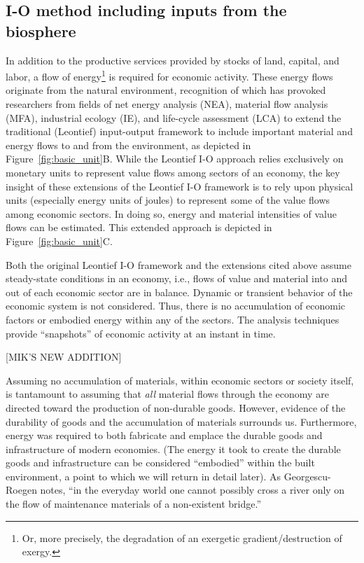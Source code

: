 \subsection{I-O method including inputs from the biosphere}

In addition to the productive services provided by stocks of land, capital, and labor,
a flow of energy\footnote{Or, more precisely, 
the degradation of an exergetic gradient/destruction of exergy.} 
is required for economic activity. 
These energy flows originate from the natural environment, 
recognition of which has provoked researchers from fields of 
net energy analysis (NEA), 
material flow analysis (MFA), 
industrial ecology (IE), and 
life-cycle assessment (LCA) 
to extend the traditional (Leontief) input-output framework 
to include important material and energy flows to and from the environment, 
as depicted in Figure~\ref{fig:basic_unit}B.\cite{Carter1974,Bullard1975,Bullard1976a,Herendeen1978,Costanza:1980ww,Casler1984,Joshi:1999uw,Suh2009}
While the Leontief I-O approach relies exclusively 
on monetary units to represent value flows 
among sectors of an economy, 
the key insight of these extensions 
of the Leontief I-O framework is to rely upon physical units 
(especially energy units of joules) 
to represent some of the value flows among economic sectors. 
In doing so, energy and material intensities of value flows can be estimated. 
This extended approach is depicted in Figure~\ref{fig:basic_unit}C. 

Both the original Leontief I-O framework 
and the extensions cited above 
assume steady-state conditions in an economy, 
i.e., flows of value and material into 
and out of each economic sector are in balance. 
Dynamic or transient behavior 
of the economic system is not considered. 
Thus, there is no accumulation of economic factors 
or embodied energy within any of the sectors. 
The analysis techniques provide ``snapshots'' 
of economic activity at an instant in time.

[MIK'S NEW ADDITION]

Assuming no accumulation of materials, 
within economic sectors or society itself, 
is tantamount to assuming that \emph{all} material flows 
through the economy are directed toward the production of non-durable goods. 
However, evidence of the durability of goods 
and the accumulation of materials surrounds us. 
Furthermore, energy was required to both fabricate and emplace 
the durable goods and infrastructure of modern economies. 
(The energy it took to create the durable goods and infrastructure 
can be considered ``embodied'' within the built environment, 
a point to which we will return in detail later). 
As Georgescu-Roegen notes, 
``in the everyday world one cannot possibly cross a river 
only on the flow of maintenance materials of a non-existent bridge.''\cite{G-R1975}


